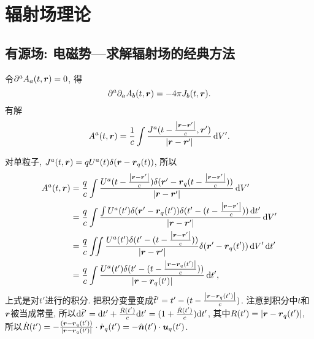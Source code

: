 \chapter{辐射场理论}

\section{有源场: 电磁势---求解辐射场的经典方法}

令$\partial^a A_a(t,\boldsymbol{r}) = 0$, 得
\begin{equation}
    \partial^a \partial_a A_b(t,\boldsymbol{r}) = -4\pi J_b(t,\boldsymbol{r}).
\end{equation}
有解
\begin{equation}
    A^a(t,\boldsymbol{r}) = \frac{1}{c} \int 
    \frac{J^a(t-\frac{\left\lvert\boldsymbol{r}-\boldsymbol{r}'\right\rvert}{c},\boldsymbol{r}')}
    {\left\lvert\boldsymbol{r}-\boldsymbol{r}'\right\rvert}\,\mathrm{d} V'.
\end{equation}

对单粒子, $J^a(t,\boldsymbol{r}) = q U^a(t) \delta(\boldsymbol{r}-\boldsymbol{r}_q(t))$, 所以
\begin{align}
    A^a(t,\boldsymbol{r}) &= \frac{q}{c} \int 
    \frac{U^a(t-\frac{\left\lvert\boldsymbol{r}-\boldsymbol{r}'\right\rvert}{c})
    \delta(\boldsymbol{r}'-\boldsymbol{r}_q(t-\frac{\left\lvert\boldsymbol{r}-\boldsymbol{r}'\right\rvert}{c}))}
    {\left\lvert\boldsymbol{r}-\boldsymbol{r}'\right\rvert}\,\mathrm{d} V'\\
    &= \frac{q}{c} \int 
    \frac{ \int
    U^a(t')
    \delta(\boldsymbol{r}'-\boldsymbol{r}_q(t'))
    \delta(t'-(t-\frac{\left\lvert\boldsymbol{r}-\boldsymbol{r}'\right\rvert}{c}))\,\mathrm{d} t'
    }
    {\left\lvert\boldsymbol{r}-\boldsymbol{r}'\right\rvert}\,\mathrm{d} V'\\
    &= \frac{q}{c} \iint 
    \frac{
    U^a(t')
    \delta(t'-(t-\frac{\left\lvert\boldsymbol{r}-\boldsymbol{r}'\right\rvert}{c}))
    }
    {\left\lvert\boldsymbol{r}-\boldsymbol{r}'\right\rvert}
    \delta(\boldsymbol{r}'-\boldsymbol{r}_q(t'))\,\mathrm{d} V'\,\mathrm{d} t'\\
    &= \frac{q}{c} \int 
    \frac{
    U^a(t')
    \delta(t'-(t-\frac{\left\lvert\boldsymbol{r}-\boldsymbol{r}_q(t')\right\rvert}{c}))
    }
    {\left\lvert\boldsymbol{r}-\boldsymbol{r}_q(t')\right\rvert}\,\mathrm{d} t',
\end{align}
上式是对$t'$进行的积分. 把积分变量变成$\tilde{t}'=t'-(t-\frac{\left\lvert\boldsymbol{r}-\boldsymbol{r}_q(t')\right\rvert}{c})$.
注意到积分中$t$和$\boldsymbol{r}$被当成常量, 所以$\mathrm{d}\tilde{t}'=\mathrm{d} t'+\frac{\dot{R}(t')}{c}\mathrm{d} t'=(1+\frac{\dot{R}(t')}{c})\mathrm{d} t'$,
其中$R(t')=\left\lvert\boldsymbol{r}-\boldsymbol{r}_q(t')\right\rvert$, 所以$\dot{R}(t')=-\frac{(\boldsymbol{r}-\boldsymbol{r}_q(t'))}{\left\lvert\boldsymbol{r}-\boldsymbol{r}_q(t')\right\rvert}\cdot\dot{\boldsymbol{r}}_q(t')=-\hat{\boldsymbol{n}}(t')\cdot\boldsymbol{u}_q(t')$.

